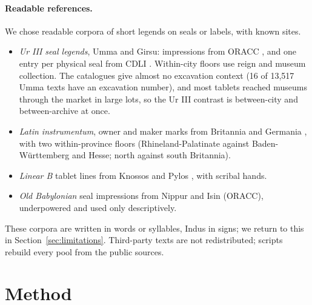 \documentclass[11pt,a4paper]{article}
\begin{document}
\paragraph{Readable references.} We chose readable corpora of short legends on seals or labels, with known sites.
\begin{itemize}
  \item \emph{Ur III seal legends}, Umma and Girsu: impressions from ORACC \citep{oracc}, and one entry per physical seal from CDLI \citep{cdli}.
  Within-city floors use reign and museum collection.
  The catalogues give almost no excavation context (16 of 13,517 Umma texts have an excavation number), and most tablets reached museums through the market in large lots, so the Ur III contrast is between-city and between-archive at once. %
  \item \emph{Latin instrumentum}, owner and maker marks from Britannia and Germania \citep{edh}, with two within-province floors (Rhineland-Palatinate against Baden-W\"urttemberg and Hesse; north against south Britannia).
  \item \emph{Linear B} tablet lines from Knossos and Pylos \citep{damos}, with scribal hands.
  \item \emph{Old Babylonian} seal impressions from Nippur and Isin (ORACC), underpowered and used only descriptively. %
\end{itemize}
These corpora are written in words or syllables, Indus in signs; we return to this in Section~\ref{sec:limitations}.
Third-party texts are not redistributed; scripts rebuild every pool from the public sources.

\section{Method}
\label{sec:methods}
\end{document}
